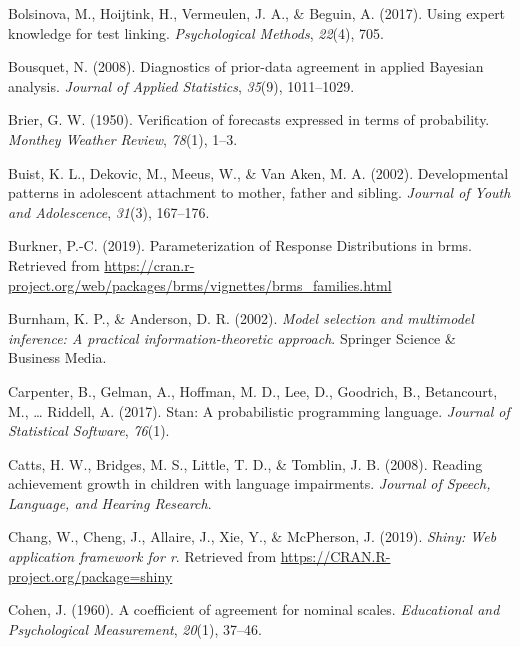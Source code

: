 \documentclass[openright,titlepage,12pt,a4paper]{book}
\begin{document}
\leavevmode\hypertarget{ref-bolsinova_using_2017}{}%
Bolsinova, M., Hoijtink, H., Vermeulen, J. A., \& Beguin, A. (2017). Using expert knowledge for test linking. \emph{Psychological Methods}, \emph{22}(4), 705.

\leavevmode\hypertarget{ref-bousquet_diagnostics_2008}{}%
Bousquet, N. (2008). Diagnostics of prior-data agreement in applied Bayesian analysis. \emph{Journal of Applied Statistics}, \emph{35}(9), 1011--1029.

\leavevmode\hypertarget{ref-brier_verification_1950}{}%
Brier, G. W. (1950). Verification of forecasts expressed in terms of probability. \emph{Monthey Weather Review}, \emph{78}(1), 1--3.

\leavevmode\hypertarget{ref-buist_developmental_2002}{}%
Buist, K. L., Dekovic, M., Meeus, W., \& Van Aken, M. A. (2002). Developmental patterns in adolescent attachment to mother, father and sibling. \emph{Journal of Youth and Adolescence}, \emph{31}(3), 167--176.

\leavevmode\hypertarget{ref-burkner_parameterization_2019}{}%
Burkner, P.-C. (2019). Parameterization of Response Distributions in brms. Retrieved from \url{https://cran.r-project.org/web/packages/brms/vignettes/brms_families.html}

\leavevmode\hypertarget{ref-burnham_model_2002}{}%
Burnham, K. P., \& Anderson, D. R. (2002). \emph{Model selection and multimodel inference: A practical information-theoretic approach}. Springer Science \& Business Media.

\leavevmode\hypertarget{ref-carpenter_stan:_2017}{}%
Carpenter, B., Gelman, A., Hoffman, M. D., Lee, D., Goodrich, B., Betancourt, M., \ldots{} Riddell, A. (2017). Stan: A probabilistic programming language. \emph{Journal of Statistical Software}, \emph{76}(1).

\leavevmode\hypertarget{ref-catts_reading_2008}{}%
Catts, H. W., Bridges, M. S., Little, T. D., \& Tomblin, J. B. (2008). Reading achievement growth in children with language impairments. \emph{Journal of Speech, Language, and Hearing Research}.

\leavevmode\hypertarget{ref-R-shiny}{}%
Chang, W., Cheng, J., Allaire, J., Xie, Y., \& McPherson, J. (2019). \emph{Shiny: Web application framework for r}. Retrieved from \url{https://CRAN.R-project.org/package=shiny}

\leavevmode\hypertarget{ref-cohen_coefficient_1960}{}%
Cohen, J. (1960). A coefficient of agreement for nominal scales. \emph{Educational and Psychological Measurement}, \emph{20}(1), 37--46.
\end{document}
